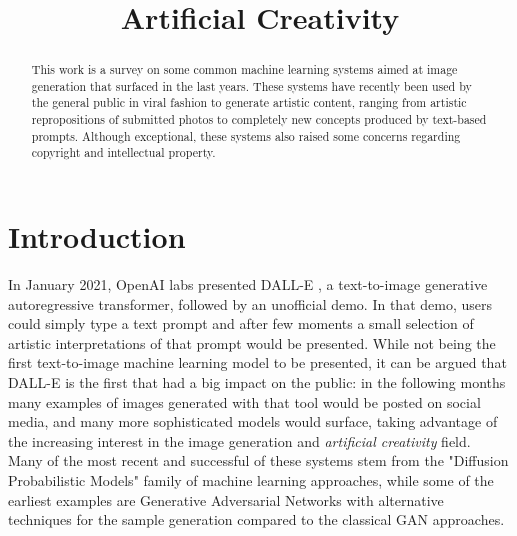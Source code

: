 \documentclass[conference]{IEEEtran}
\begin{document}
\title{Artificial Creativity}

\author{
}

\maketitle

\begin{abstract}
This work is a survey on some common machine learning systems aimed at image generation that surfaced in the last years. These systems have recently been used by the general public in viral fashion to generate artistic content, ranging from artistic repropositions of submitted photos to completely new concepts produced by text-based prompts. Although exceptional, these systems also raised some concerns regarding copyright and intellectual property.
\end{abstract}

\section{Introduction}
In January 2021, OpenAI labs presented DALL-E \cite{dallepaper}, a text-to-image generative autoregressive transformer, followed by an unofficial demo. In that demo, users could simply type a text prompt and after few moments a small selection of artistic interpretations of that prompt would be presented. While not being the first text-to-image machine learning model to be presented, it can be argued that DALL-E is the first that had a big impact on the public: in the following months many examples of images generated with that tool would be posted on social media, and many more sophisticated models would surface, taking advantage of the increasing interest in the image generation and \textit{artificial creativity} field.\\
Many of the most recent and successful of these systems stem from the "Diffusion Probabilistic Models" \cite{diffusionmodels} family of machine learning approaches, while some of the earliest examples are Generative Adversarial Networks \cite{GANs} with alternative techniques for the sample generation \cite{stylegan} compared to the classical GAN approaches.
\end{document}
